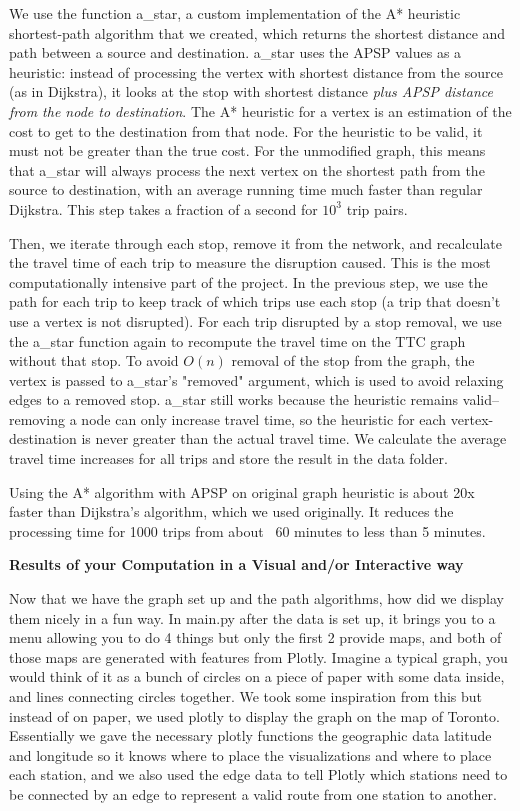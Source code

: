 \documentclass[fontsize=11pt]{article}
\begin{document}
We use the function a\_star, a custom implementation of the A* heuristic shortest-path algorithm that we created, which returns the shortest distance and path between a source and destination. a\_star uses the APSP values as a heuristic: instead of processing the vertex with shortest distance from the source (as in Dijkstra), it looks at the stop with shortest distance \textit{plus APSP distance from the node to destination}. The A* heuristic for a vertex is an estimation of the cost to get to the destination from that node. For the heuristic to be valid, it must not be greater than the true cost. For the unmodified graph, this means that a\_star will always process the next vertex on the shortest path from the source to destination, with an average running time much faster than regular Dijkstra. This step takes a fraction of a second for $10^3$ trip pairs.

Then, we iterate through each stop, remove it from the network, and recalculate the travel time of each trip to measure the disruption caused. This is the most computationally intensive part of the project. In the previous step, we use the path for each trip to keep track of which trips use each stop (a trip that doesn't use a vertex is not disrupted). For each trip disrupted by a stop removal, we use the a\_star function again to recompute the travel time on the TTC graph without that stop. To avoid $O(n)$ removal of the stop from the graph, the vertex is passed to a\_star's "removed" argument, which is used to avoid relaxing edges to a removed stop. a\_star still works because the heuristic remains valid–removing a node can only increase travel time, so the heuristic for each vertex-destination is never greater than the actual travel time. We calculate the average travel time increases for all trips and store the result in the data folder. \newline 

Using the A* algorithm with APSP on original graph heuristic is about 20x faster than Dijkstra's algorithm, which we used originally. It reduces the processing time for 1000 trips from about ~60 minutes to less than 5 minutes.

\vspace{1em}

\textbf{Results of your Computation in a Visual and/or Interactive way}

Now that we have the graph set up and the path algorithms, how did we display them nicely in a fun way. In main.py after the data is set up, it brings you to a menu allowing you to do 4 things but only the first 2 provide maps, and both of those maps are generated with features from Plotly. Imagine a typical graph, you would think of it as a bunch of circles on a piece of paper with some data inside, and lines connecting circles together. We took some inspiration from this but instead of on paper, we used plotly to display the graph on the map of Toronto. Essentially we gave the necessary plotly functions the geographic data latitude and longitude so it knows where to place the visualizations and where to place each station, and we also used the edge data to tell Plotly which stations need to be connected by an edge to represent a valid route from one station to another. 
\end{document}

